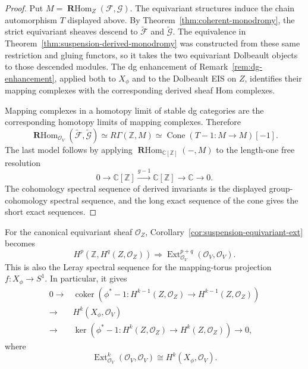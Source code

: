 \documentclass[12pt]{amsart}
\theoremstyle{definition}
\theoremstyle{remark}
\numberwithin{equation}{section}
\newcommand{\CO}{\mathcal O}
\newcommand{\C}{\mathbb C}
\newcommand{\rhom}{\operatorname{\mathbf{R}Hom}}
\newcommand{\ext}{\operatorname{Ext}}
\begin{document}
\begin{proof}
Put \(M=\rhom_Z(\mathcal F,\mathcal G)\).  The equivariant structures
induce the chain automorphism \(T\) displayed above.  By
Theorem~\ref{thm:coherent-monodromy}, the strict equivariant sheaves descend
to \(\widetilde{\mathcal F}\) and \(\widetilde{\mathcal G}\).  The
equivalence in Theorem~\ref{thm:suspension-derived-monodromy} was constructed
from these same restriction and gluing functors, so it takes the two
equivariant Dolbeault objects to those descended modules.  The dg
enhancement of Remark~\ref{rem:dg-enhancement}, applied both to \(X_\phi\)
and to the Dolbeault EIS on \(Z\), identifies their mapping complexes with
the corresponding derived sheaf Hom complexes.

Mapping complexes in a homotopy limit of stable dg categories are the
corresponding homotopy limits of mapping complexes.  Therefore
\[
\rhom_{\CO_V}
\left(
\widetilde{\mathcal F},\widetilde{\mathcal G}
\right)
\simeq
R\Gamma(\mathbb Z,M)
\simeq
\operatorname{Cone}(T-1:M\longrightarrow M)[-1].
\]
The last model follows by applying
\(\rhom_{\C[\mathbb Z]}(-,M)\) to the length-one free resolution
\[
0\longrightarrow
\C[\mathbb Z]
\xrightarrow{g-1}
\C[\mathbb Z]
\longrightarrow
\C
\longrightarrow0.
\]
The cohomology spectral sequence of derived invariants is the displayed
group-cohomology spectral sequence, and the long exact sequence of the cone
gives the short exact sequences.
\end{proof}

For the canonical equivariant sheaf \(\CO_Z\),
Corollary~\ref{cor:suspension-equivariant-ext} becomes
\[
H^p\left(\mathbb Z,H^q(Z,\CO_Z)\right)
\Longrightarrow
\ext_{\CO_V}^{p+q}(\CO_V,\CO_V).
\]
This is also the Leray spectral sequence for the mapping-torus projection
\(f:X_\phi\to S^1\).  In particular, it gives
\[
\begin{split}
0\longrightarrow&
\operatorname{coker}\left(
\phi^*-1:H^{k-1}(Z,\CO_Z)\longrightarrow H^{k-1}(Z,\CO_Z)
\right)\\
\longrightarrow&
H^k(X_\phi,\CO_V)\\
\longrightarrow&
\ker\left(
\phi^*-1:H^k(Z,\CO_Z)\longrightarrow H^k(Z,\CO_Z)
\right)
\longrightarrow0,
\end{split}
\]
where
\[
\ext^k_{\CO_V}(\CO_V,\CO_V)
\cong H^k(X_\phi,\CO_V).
\]
\end{document}
